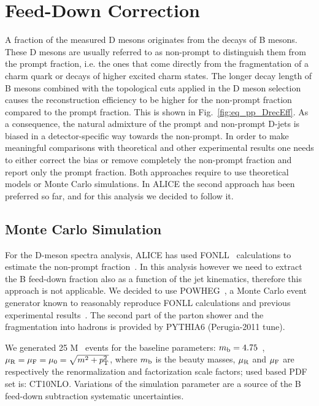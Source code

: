 \section{Feed-Down Correction}
\label{sec:FD}

A fraction of the measured D mesons originates from the decays of B mesons. These D mesons are usually referred to as non-prompt
to distinguish them from the prompt fraction, i.e. the ones that come directly from the fragmentation of a charm quark or decays of higher excited charm states.
The longer decay length of B mesons combined with the topological cuts applied in the D meson selection causes the reconstruction efficiency 
to be higher for the non-prompt fraction compared to the prompt fraction. This is shown in Fig.~\ref{fig:eq_pp_DrecEff}.
As a consequence, the natural admixture of the prompt and non-prompt D-jets is biased in a detector-specific way towards the non-prompt.
In order to make meaningful comparisons with theoretical and other experimental results one needs to either correct the bias or remove completely the non-prompt fraction and report only the prompt fraction. 
Both approaches require to use theoretical models or Monte Carlo simulations.
In ALICE the second approach has been preferred so far, and for this analysis we decided to follow it.

\subsection{Monte Carlo Simulation}

For the D-meson spectra analysis, ALICE has used FONLL~\cite{Cacciari:1998} calculations to estimate the non-prompt fraction~\cite{ALICE:2011aa, ALICE:2014d, ALICE:2016a}.
In this analysis however we need to extract the B feed-down fraction also as a function of the jet kinematics, therefore this approach is not applicable.
We decided to use POWHEG~\cite{Alioli:2010}, a Monte Carlo event generator known to reasonably reproduce FONLL calculations and previous experimental results~\cite{Cacciari:2012b}.
The second part of the parton shower and the fragmentation into hadrons is provided by PYTHIA6 (Perugia-2011 tune).

We generated 25 M \bbbar\ events for the baseline parameters: 
$m_{\rm b} = 4.75$~\GeVcsq, $\mu_{\rm R} = \mu_{\rm F} =\mu_{0} = \sqrt{m^2+p_{\rm T}^2}$,
where $m_{\rm b}$ is the beauty masses, $\mu_{\rm R}$ and $\mu_{\rm F}$ are respectively the renormalization and factorization scale factors; used based PDF set is: CT10NLO.
Variations of the simulation parameter are a source of the B feed-down subtraction systematic uncertainties.

